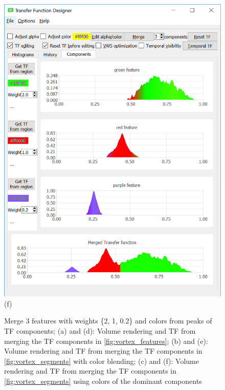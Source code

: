 \documentclass[twoside,twocolumn,10pt]{article}
\begin{document}
\begin{figure}
\begin{minipage}{.16\textwidth}
		\includegraphics[width=1\linewidth]{tf_vortex_merged_segment_green_red_purple}
		(f)
	\end{minipage}
	\caption{Merge 3 features with weights \{2, 1, 0.2\} and colors from peaks of TF components; (a) and (d): Volume rendering and TF from merging the TF components in \autoref{fig:vortex_features}; (b) and (e): Volume rendering and TF from merging the TF components in \autoref{fig:vortex_segments} with color blending; (c) and (f): Volume rendering and TF from merging the TF components in \autoref{fig:vortex_segments} using colors of the dominant components}
	\label{fig:vortex_merged}
\end{figure}
\end{document}
